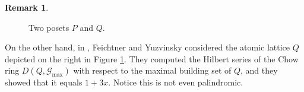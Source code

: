 \documentclass[11pt, a4paper, english]{amsart}
\theoremstyle{teoremas}
\theoremstyle{definition}
\newtheorem{remark}[theorem]{Remark}
\begin{document}
\begin{remark}
\begin{figure}[ht]
\caption{Two posets $P$ and $Q$.}\label{fig:counterexample-generalposet}
\end{figure}

    On the other hand, in \cite[p.~535]{feichtner-yuzvinsky}, Feichtner and Yuzvinsky considered the atomic lattice $Q$ depicted on the right in Figure \ref{fig:counterexample-generalposet}. They computed the Hilbert series of the Chow ring $D(Q,\mathcal{G}_{\max})$ with respect to the maximal building set of $Q$, and they showed that it equals $1+3x$. Notice this is not even palindromic.
\end{remark}


\end{document}
